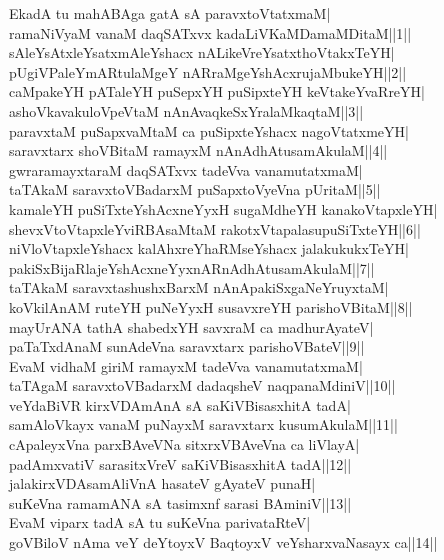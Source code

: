 \documentclass{article}
\begin{document}
EkadA tu mahABAga gatA sA paravxtoVtatxmaM|\\
ramaNiVyaM vanaM daqSATxvx kadaLiVKaMDamaMDitaM||1||\\
sAleYsAtxleYsatxmAleYshacx nALikeVreYsatxthoVtakxTeYH|\\
pUgiVPaleYmARtulaMgeY nARraMgeYshAcxrujaMbukeYH||2||\\
caMpakeYH pATaleYH puSepxYH puSipxteYH keVtakeYvaRreYH|\\
ashoVkavakuloVpeVtaM nAnAvaqkeSxYralaMkaqtaM||3||\\
paravxtaM puSapxvaMtaM ca puSipxteYshacx nagoVtatxmeYH|\\
saravxtarx shoVBitaM ramayxM nAnAdhAtusamAkulaM||4||\\
gwraramayxtaraM daqSATxvx tadeVva vanamutatxmaM|\\
taTAkaM saravxtoVBadarxM puSapxtoVyeVna pUritaM||5||\\
kamaleYH puSiTxteYshAcxneYyxH sugaMdheYH kanakoVtapxleYH|\\
shevxVtoVtapxleYviRBAsaMtaM rakotxVtapalasupuSiTxteYH||6||\\
niVloVtapxleYshacx kalAhxreYhaRMseYshacx jalakukukxTeYH|\\
pakiSxBijaRlajeYshAcxneYyxnARnAdhAtusamAkulaM||7||\\
taTAkaM saravxtashushxBarxM nAnApakiSxgaNeYruyxtaM|\\
koVkilAnAM ruteYH puNeYyxH susavxreYH parishoVBitaM||8||\\
mayUrANA tathA shabedxYH savxraM ca madhurAyateV|\\
paTaTxdAnaM sunAdeVna saravxtarx parishoVBateV||9||\\
EvaM vidhaM giriM ramayxM tadeVva vanamutatxmaM|\\
taTAgaM saravxtoVBadarxM dadaqsheV naqpanaMdiniV||10||\\
veYdaBiVR kirxVDAmAnA sA saKiVBisasxhitA tadA|\\
samAloVkayx vanaM puNayxM saravxtarx kusumAkulaM||11||\\
cApaleyxVna parxBAveVNa sitxrxVBAveVna ca liVlayA|\\
padAmxvatiV sarasitxVreV saKiVBisasxhitA tadA||12||\\
jalakirxVDAsamAliVnA hasateV gAyateV punaH|\\
suKeVna ramamANA sA tasimxnf sarasi BAminiV||13||\\
EvaM viparx tadA sA tu suKeVna parivataRteV|\\
goVBiloV nAma veY deYtoyxV BaqtoyxV veYsharxvaNasayx ca||14||\\
\end{document}
